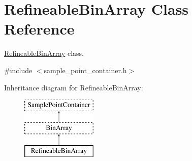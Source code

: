 \hypertarget{classRefineableBinArray}{}\section{Refineable\+Bin\+Array Class Reference}
\label{classRefineableBinArray}


\hyperlink{classRefineableBinArray}{Refineable\+Bin\+Array} class.  




{\ttfamily \#include $<$sample\+\_\+point\+\_\+container.\+h$>$}

Inheritance diagram for Refineable\+Bin\+Array\+:\begin{figure}[H]
\begin{center}
\leavevmode
\includegraphics[height=3.000000cm]{classRefineableBinArray}
\end{center}
\end{figure}

